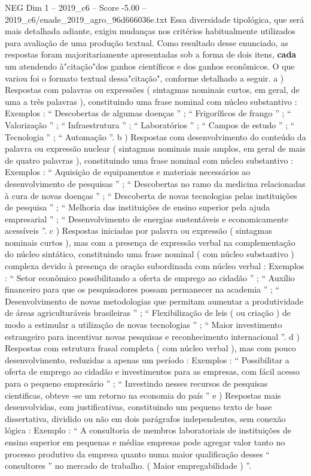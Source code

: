 \begin{textsample}{NEG Dim 1 – 2019\_c6 – Score -5.00 – 2019\_c6/enade\_2019\_agro\_96d666036e.txt}
Essa diversidade tipológica, que será mais detalhada adiante, exigiu mudanças nos critérios habitualmente utilizados para avaliação de uma produção textual.
Como resultado desse enunciado, as respostas foram majoritariamente apresentadas sob a forma de dois itens, \textbf{cada} um atendendo à"citação"dos ganhos científicos e dos ganhos econômicos.
O que variou foi o formato textual dessa"citação", conforme detalhado a seguir. a ) Respostas com palavras ou expressões ( sintagmas nominais curtos, em geral, de uma a três palavras ), constituindo uma frase nominal com núcleo substantivo : Exemplos : “ Descobertas de algumas doenças ” ; “ Frigoríficos de frango ” ; “ Valorização ” ; “ Infraestrutura ” ; “ Laboratórios ” ; “ Campos de estudo ” ; “ Tecnologia ” ; “ Automação ”. b ) Respostas com desenvolvimento do conteúdo da palavra ou expressão nuclear ( sintagmas nominais mais amplos, em geral de mais de quatro palavras ), constituindo uma frase nominal com núcleo substantivo : Exemplos : “ Aquisição de equipamentos e materiais necessários ao desenvolvimento de pesquisas ” ; “ Descobertas no ramo da medicina relacionadas à cura de novas doenças ” ; “ Descoberta de novas tecnologias pelas instituições de pesquisa ” ; “ Melhoria das instituições de ensino superior pela ajuda empresarial ” ; “ Desenvolvimento de energias sustentáveis e economicamente acessíveis ”. c ) Respostas iniciadas por palavra ou expressão ( sintagmas nominais curtos ), mas com a presença de expressão verbal na complementação do núcleo sintático, constituindo uma frase nominal ( com núcleo substantivo ) complexa devido à presença de oração subordinada com núcleo verbal : Exemplos : “ Setor econômico possibilitando a oferta de emprego ao cidadão ” ; “ Auxílio financeiro para que os pesquisadores possam permanecer na academia ” ; “ Desenvolvimento de novas metodologias que permitam aumentar a produtividade de áreas agriculturáveis brasileiras ” ; “ Flexibilização de leis ( ou criação ) de modo a estimular a utilização de novas tecnologias ” ; “ Maior investimento estrangeiro para incentivar novas pesquisas e reconhecimento internacional ”. d ) Respostas com estrutura frasal completa ( com núcleo verbal ), mas com pouco desenvolvimento, reduzidas a apenas um período : Exemplos : “ Possibilitar a oferta de emprego ao cidadão e investimentos para as empresas, com fácil acesso para o pequeno empresário ” ; “ Investindo nesses recursos de pesquisas cientificas, obteve -se um retorno na economia do país ” e ) Respostas mais desenvolvidas, com justificativas, constituindo um pequeno texto de base dissertativa, dividido ou não em dois parágrafos independentes, sem conexão lógica : Exemplo : “ A consultoria de membros laboratoriais de instituições de ensino superior em pequenas e médias empresas pode agregar valor tanto no processo produtivo da empresa quanto numa maior qualificação desses “ consultores ” no mercado de trabalho. ( Maior empregabilidade ) ”.

\end{textsample}

